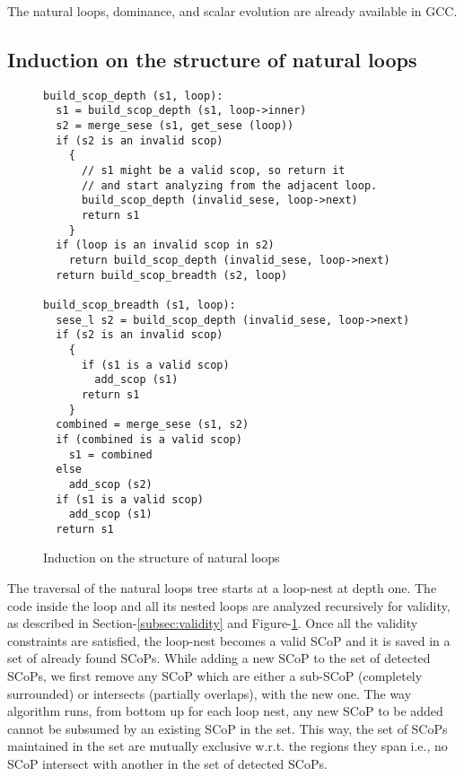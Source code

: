 \documentclass{sig-alternate}
\begin{document}
The natural loops, dominance, and scalar evolution are already available in
GCC.

\subsection{Induction on the structure of natural loops}
\label{subsec:induction}

\begin{figure}
\begin{verbatim}
build_scop_depth (s1, loop):
  s1 = build_scop_depth (s1, loop->inner)
  s2 = merge_sese (s1, get_sese (loop))
  if (s2 is an invalid scop)
    {
      // s1 might be a valid scop, so return it
      // and start analyzing from the adjacent loop.
      build_scop_depth (invalid_sese, loop->next)
      return s1
    }
  if (loop is an invalid scop in s2)
    return build_scop_depth (invalid_sese, loop->next)
  return build_scop_breadth (s2, loop)

build_scop_breadth (s1, loop):
  sese_l s2 = build_scop_depth (invalid_sese, loop->next)
  if (s2 is an invalid scop)
    {
      if (s1 is a valid scop)
        add_scop (s1)
      return s1
    }
  combined = merge_sese (s1, s2)
  if (combined is a valid scop)
    s1 = combined
  else
    add_scop (s2)
  if (s1 is a valid scop)
    add_scop (s1)
  return s1
\end{verbatim}
\caption{Induction on the structure of natural loops}
\label{fig:induction}
\end{figure}

The traversal of the natural loops tree starts at a loop-nest at depth one.  The
code inside the loop and all its nested loops are analyzed recursively for
validity, as described in Section-\ref{subsec:validity} and
Figure-\ref{fig:induction}.  Once all the validity constraints are satisfied,
the loop-nest becomes a valid SCoP and it is saved in a set of
already found SCoPs. While adding a new SCoP to the set of detected SCoPs, we
first remove any SCoP which are either a sub-SCoP (completely surrounded) or
intersects (partially overlaps), with the new one. The way algorithm runs, from
bottom up for each loop nest, any new SCoP to be added cannot be subsumed by an
existing SCoP in the set. This way, the set of SCoPs maintained in the set are
mutually exclusive w.r.t. the regions they span i.e., no SCoP intersect with
another in the set of detected SCoPs.
\end{document}
